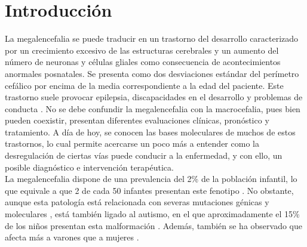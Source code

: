 \section{Introducción}

La megalencefalia se puede traducir en un trastorno del desarrollo caracterizado por un crecimiento excesivo de las estructuras cerebrales y un aumento del número de neuronas y células gliales como consecuencia de acontecimientos anormales posnatales. Se presenta como dos desviaciones estándar del perímetro cefálico por encima de la media correspondiente a la edad del paciente. Este trastorno suele provocar epilepsia, discapacidades en el desarrollo y problemas de conducta \cite{pavone_clinical_2017}.
No se debe confundir la megalencefalia con la macrocefalia, pues bien pueden coexistir, presentan diferentes evaluaciones clínicas, pronóstico y tratamiento. 
A día de hoy, se conocen las bases moleculares de muchos de estos trastornos, lo cual permite acercarse un poco más a entender como la desregulación de ciertas vías puede conducir a la enfermedad, y con ello, un posible diagnóstico e intervención terapéutica. \cite{winden_megalencephaly_2015} \\


La megalencefalia dispone de una prevalencia del 2\% de la población infantil, lo que equivale a que 2 de cada 50 infantes presentan este fenotipo \cite{sandler_neurodevelopmental_1997}. No obstante, aunque esta patología está relacionada con severas mutaciones génicas y moleculares \cite{pavone_clinical_2017}, está también ligado al autismo, en el que aproximadamente el 15\% de los niños presentan esta malformación \cite{libero_persistence_2016}. Además, también se ha observado que afecta más a varones que a mujeres \cite{noauthor_megalencephaly_nodate}. \\